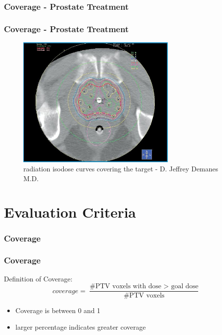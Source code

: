 \documentclass{beamer}
\begin{document}
\subsubsection*{Coverage - Prostate Treatment}
\begin{frame}
\frametitle{Coverage - Prostate Treatment}
\begin{figure}[h] 
  \centering
     \includegraphics[width=0.7\textwidth]{pictures/cover.JPG}
  \caption{radiation isodose curves covering the target - D. Jeffrey Demanes M.D.}
  \label{fig:cover}
\end{figure}
\end{frame}



\section{Evaluation Criteria}
\frame{\tableofcontents[currentsection]}
	\subsubsection{Coverage}	
		\begin{frame}
			\frametitle{Coverage}
			Definition of Coverage:
			\begin{equation}
				coverage = \frac{\text{\# PTV voxels with dose $>$ goal dose}}{\text{\# PTV voxels}}
			\end{equation}
			\begin{itemize}
				\item Coverage is between 0 and 1 
				\item larger percentage indicates greater coverage
			\end{itemize}   
		\end{frame}
		
\end{document}
